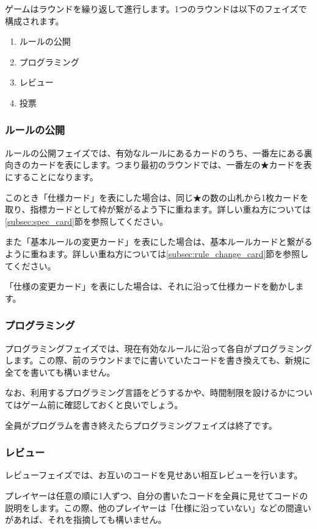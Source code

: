 \documentclass[index]{subfiles}
\begin{document}
ゲームはラウンドを繰り返して進行します。1つのラウンドは以下のフェイズで構成されます。

\begin{enumerate}
\item ルールの公開
\item プログラミング
\item レビュー
\item 投票
\end{enumerate}

  \subsubsection{ルールの公開}
  
{\sf ルールの公開フェイズ}では、有効なルールにあるカードのうち、一番左にある裏向きのカードを表にします。つまり最初のラウンドでは、一番左の★カードを表にすることになります。

このとき「仕様カード」を表にした場合は、同じ★の数の山札から1枚カードを取り、指標カードとして枠が繋がるよう下に重ねます。詳しい重ね方については\ref{subsec:spec_card}節を参照してください。

また「基本ルールの変更カード」を表にした場合は、基本ルールカードと繋がるように重ねます。詳しい重ね方については\ref{subsec:rule_change_card}節を参照してください。

「仕様の変更カード」を表にした場合は、それに沿って仕様カードを動かします。

  \subsubsection{プログラミング} 

{\sf プログラミング}フェイズでは、現在有効なルールに沿って各自がプログラミングします。この際、前のラウンドまでに書いていたコードを書き換えても、新規に全てを書いても構いません。

なお、利用するプログラミング言語をどうするかや、時間制限を設けるかについてはゲーム前に確認しておくと良いでしょう。

全員がプログラムを書き終えたらプログラミングフェイズは終了です。

  \subsubsection{レビュー}

{\sf レビューフェイズ}では、お互いのコードを見せあい相互レビューを行います。

プレイヤーは任意の順に1人ずつ、自分の書いたコードを全員に見せてコードの説明をします。この際、他のプレイヤーは「仕様に沿っていない」などの間違いがあれば、それを指摘しても構いません。
\end{document}
